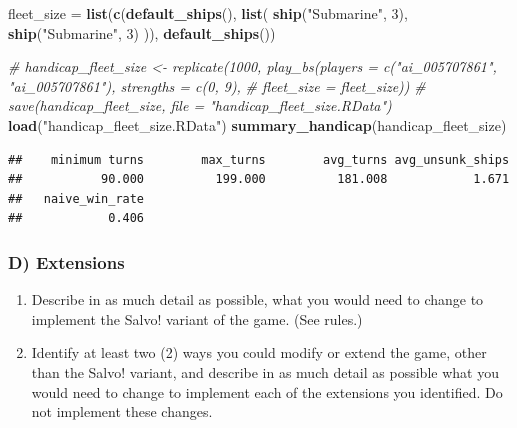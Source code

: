 \documentclass[
]{article}
\newenvironment{Shaded}{\begin{snugshade}}{\end{snugshade}}
\newcommand{\CommentTok}[1]{\textcolor[rgb]{0.56,0.35,0.01}{\textit{#1}}}
\newcommand{\DecValTok}[1]{\textcolor[rgb]{0.00,0.00,0.81}{#1}}
\newcommand{\FunctionTok}[1]{\textcolor[rgb]{0.13,0.29,0.53}{\textbf{#1}}}
\newcommand{\NormalTok}[1]{#1}
\newcommand{\OtherTok}[1]{\textcolor[rgb]{0.56,0.35,0.01}{#1}}
\newcommand{\StringTok}[1]{\textcolor[rgb]{0.31,0.60,0.02}{#1}}
\begin{document}
\begin{Shaded}
\begin{Highlighting}[]
\NormalTok{fleet\_size }\OtherTok{=} \FunctionTok{list}\NormalTok{(}\FunctionTok{c}\NormalTok{(}\FunctionTok{default\_ships}\NormalTok{(), }\FunctionTok{list}\NormalTok{(}
  \FunctionTok{ship}\NormalTok{(}\StringTok{"Submarine"}\NormalTok{, }\DecValTok{3}\NormalTok{), }\FunctionTok{ship}\NormalTok{(}\StringTok{"Submarine"}\NormalTok{, }\DecValTok{3}\NormalTok{)}
\NormalTok{)),}
\FunctionTok{default\_ships}\NormalTok{())}

\CommentTok{\# handicap\_fleet\_size \textless{}{-} replicate(1000, play\_bs(players = c("ai\_005707861", "ai\_005707861"), strengths = c(0, 9), }
\CommentTok{\#         fleet\_size = fleet\_size))}
\CommentTok{\# save(handicap\_fleet\_size, file = "handicap\_fleet\_size.RData")}
\FunctionTok{load}\NormalTok{(}\StringTok{"handicap\_fleet\_size.RData"}\NormalTok{)}
\FunctionTok{summary\_handicap}\NormalTok{(handicap\_fleet\_size)}
\end{Highlighting}
\end{Shaded}

\begin{verbatim}
##    minimum turns        max_turns        avg_turns avg_unsunk_ships 
##           90.000          199.000          181.008            1.671 
##   naive_win_rate 
##            0.406
\end{verbatim}

\subsubsection{D) Extensions}\label{d-extensions}

\begin{enumerate}[label=\alph*)]
\item Describe in as much detail as possible, what you would need to change to implement the Salvo! variant of the game. (See rules.)
\item Identify at least two (2) ways you could modify or extend the game, other than the Salvo! variant, and describe in as much detail as possible what you would need to change to implement each of the extensions you identified. Do not implement these changes.
\end{enumerate}
\end{document}
